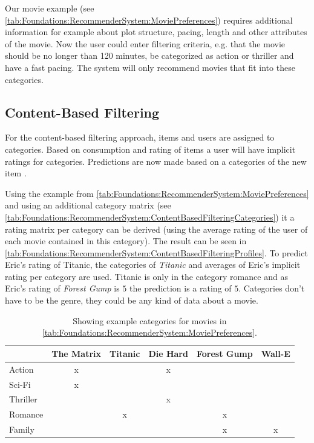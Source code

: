 Our movie example (see \autoref{tab:Foundations:RecommenderSystem:MoviePreferences}) requires additional information for example about plot structure, pacing, length and other attributes of the movie. Now the user could enter filtering criteria, e.g. that the movie should be no longer than 120 minutes, be categorized as action or thriller and have a fast pacing. The system will only recommend movies that fit into these categories.

\subsection{Content-Based Filtering}
For the content-based filtering approach, items and users are assigned to categories. Based on consumption and rating of items a user will have implicit ratings for categories. Predictions are now made based on a categories of the new item \cite[~ pp. 10, 11]{felfernigDecisionTasksBasic2018}.

Using the example from \autoref{tab:Foundations:RecommenderSystem:MoviePreferences} and using an additional category matrix (see \autoref{tab:Foundations:RecommenderSystem:ContentBasedFilteringCategories}) it a rating matrix per category can be derived (using the average rating of the user of each movie contained in this category). The result can be seen in \autoref{tab:Foundations:RecommenderSystem:ContentBasedFilteringProfiles}. To predict Eric's rating of Titanic, the categories of \textit{Titanic} and averages of Eric's implicit rating per category are used. Titanic is only in the category romance and as Eric's rating of \textit{Forest Gump} is $5$ the prediction is a rating of $5$. Categories don't have to be the genre, they could be any kind of data about a movie.

\begin{table}
    \centering    
    \begin{tabular}{ l | c | c | c | c | c }
        & The Matrix & Titanic & Die Hard & Forest Gump & Wall-E \\ \hline
         Action  & x &  & x  &  &  \\
         Sci-Fi  & x &  &  &  &  \\
         Thriller  &  & & x &  &  \\
         Romance & & x & & x & \\
         Family & & & & x & x \\
    \end{tabular}
    \caption{Showing example categories for movies in \autoref{tab:Foundations:RecommenderSystem:MoviePreferences}.}
    
    \label{tab:Foundations:RecommenderSystem:ContentBasedFilteringCategories}
\end{table}


